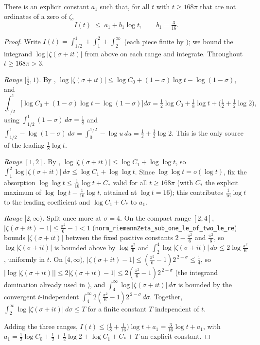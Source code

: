 \begin{lemma}
\label{lem:lb_I_upper}
\leanok
{}
There is an explicit constant $a_1$ such that, for all $t$ with $t\ge168\pi$ that
are not ordinates of a zero of $\zeta$,
\[
  I(t) \;\le\; a_1 + b_1\log t,
  \qquad b_1 = \tfrac3{16}.
\]
\end{lemma}

\begin{proof}
\leanok
{}
Write $I(t)=\int_{1/2}^{1}+\int_{1}^{2}+\int_{2}^{\infty}$ (each piece finite by
); we bound the integrand $\log|\zeta(\sigma+it)|$ from
above on each range and integrate. Throughout $t\ge168\pi>3$.

\emph{Range $[\tfrac12,1)$.} By ,
$\log|\zeta(\sigma+it)|\le\log C_0+(1-\sigma)\log t-\log(1-\sigma)$, and
\[
  \int_{1/2}^{1}\!\bigl[\log C_0+(1-\sigma)\log t-\log(1-\sigma)\bigr]d\sigma
  = \tfrac12\log C_0 + \tfrac18\log t + \bigl(\tfrac12+\tfrac12\log2\bigr),
\]
using $\int_{1/2}^{1}(1-\sigma)\,d\sigma=\tfrac18$ and
$\int_{1/2}^{1}-\log(1-\sigma)\,d\sigma=\int_{0}^{1/2}-\log u\,du
=\tfrac12+\tfrac12\log2$. This is the only source of the leading $\tfrac18\log t$.

\emph{Range $[1,2]$.} By ,
$\log|\zeta(\sigma+it)|\le\log C_1+\log\log t$, so
$\int_1^2\log|\zeta(\sigma+it)|\,d\sigma\le\log C_1+\log\log t$. Since
$\log\log t=o(\log t)$, fix the absorption $\log\log t\le\tfrac1{16}\log t+C_\ast$
valid for all $t\ge168\pi$ (with $C_\ast$ the explicit maximum of
$\log\log t-\tfrac1{16}\log t$, attained at $\log t=16$); this contributes
$\tfrac1{16}\log t$ to the leading coefficient and $\log C_1+C_\ast$ to $a_1$.

\emph{Range $[2,\infty)$.} Split once more at $\sigma=4$. On the compact range
$[2,4]$, $|\zeta(\sigma+it)-1|\le\tfrac{\pi^2}6-1<1$
(\texttt{norm\_riemannZeta\_sub\_one\_le\_of\_two\_le\_re}) bounds $|\zeta(\sigma+it)|$
between the fixed positive constants $2-\tfrac{\pi^2}6$ and $\tfrac{\pi^2}6$, so
$\log|\zeta(\sigma+it)|$ is bounded above by $\log\tfrac{\pi^2}6$ and
$\int_2^4\log|\zeta(\sigma+it)|\,d\sigma\le2\log\tfrac{\pi^2}6$, uniformly in $t$.
On $[4,\infty)$, $|\zeta(\sigma+it)-1|\le(\tfrac{\pi^2}6-1)2^{\,2-\sigma}\le\tfrac14$,
so $|\log|\zeta(\sigma+it)||\le2|\zeta(\sigma+it)-1|\le2(\tfrac{\pi^2}6-1)2^{\,2-\sigma}$
(the integrand domination already used in ), and
$\int_4^\infty\log|\zeta(\sigma+it)|\,d\sigma$ is bounded by the convergent
$t$-independent $\int_4^\infty 2(\tfrac{\pi^2}6-1)2^{\,2-\sigma}\,d\sigma$. Together,
$\int_2^\infty\log|\zeta(\sigma+it)|\,d\sigma\le T$ for a finite constant $T$
independent of $t$.

Adding the three ranges, $I(t)\le\bigl(\tfrac18+\tfrac1{16}\bigr)\log t+a_1
=\tfrac3{16}\log t+a_1$, with
$a_1=\tfrac12\log C_0+\tfrac12+\tfrac12\log2+\log C_1+C_\ast+T$ an explicit constant.
\end{proof}

